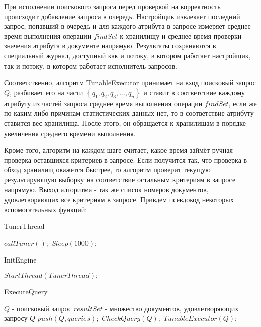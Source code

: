 \documentclass{matmex-diploma}
\begin{document}
        При исполнении поискового запроса перед проверкой на корректность происходит добавление запроса в очередь. Настройщик извлекает последний запрос, попавший в очередь и для каждого атрибута в запросе измеряет среднее время выполнения операции $findSet$  к хранилищу и среднее время проверки значения атрибута в документе напрямую. Результаты сохраняются в специальный журнал, доступный как и потоку, в котором работает настройщик, так и потоку, в котором работает исполнитель запросов.
        
        Соответственно, алгоритм TunableExecutor принимает на вход поисковый запрос $Q$, разбивает его на части $\left\{ q_1, q_2, q_3, ... , q_n \right\} $ и ставит в соответствие каждому атрибуту из частей запроса среднее время выполнения операции $findSet$, если же по каким-либо причинам статистических данных нет, то в соответствие атрибуту ставится вес хранилища. После этого, он обращается к хранилищам в порядке увеличения среднего времени выполнения. 
        
        Кроме того, алгоритм на каждом шаге считает, какое время займёт ручная проверка оставшихся критериев в запросе. Если получится так, что проверка в обход хранилищ окажется быстрее, то алгоритм проверит текущую результирующую выборку на соответствие остальным критериям в запросе напрямую. Выход алгоритма - так же список номеров документов, удовлетворяющих все критериям в запросе. Привдем псевдокод некоторых вспомогательных функций:
        \begin{algorithm}[H]
        \caption{TunerThread}
        \label{tunerThread}
            \begin{algorithmic}
                    \STATE $callTuner();$
                    \STATE $Sleep(1000);$
                \ENDWHILE
            \end{algorithmic}
        \end{algorithm}
        
        \begin{algorithm}[H]
        \caption{InitEngine}
        \label{init}
            \begin{algorithmic}
                \STATE $StartThread(TunerThread);$
            \end{algorithmic}
        \end{algorithm}
        
        \begin{algorithm}[H]
        \caption{ExecuteQuery}
        \label{exec}
            \begin{algorithmic}
                \REQUIRE $Q$ - поисковый запрос
                \ENSURE $resultSet$ - множество документов, удовлетворяющих запросу $Q$
                \STATE $push(Q, queries);$
                \STATE $CheckQuery(Q);$  
                \RETURN $TunableExecutor(Q);$
            \end{algorithmic}
        \end{algorithm}
        
\end{document}
